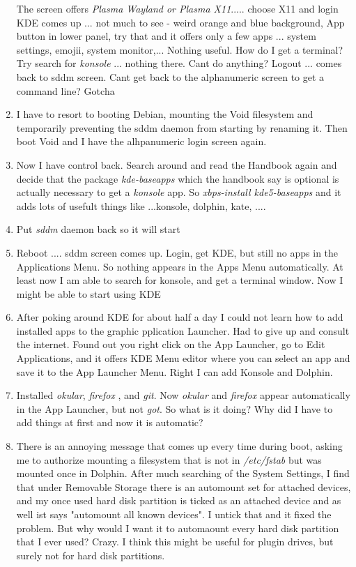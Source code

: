 \documentclass{article}  %
\begin{document}
\begin{enumerate}
The screen offers {\em Plasma Wayland or Plasma X11}..... choose X11 and login
KDE comes up ... not much to see - weird orange and blue background, App button in lower panel, try that and it offers only a few apps ... system settings, emojii, system monitor,... Nothing useful. How do I get a terminal? Try search for {\em konsole} ... nothing there. Cant do anything? Logout ... comes back to sddm screen. Cant get back to the alphanumeric screen to get a command line? Gotcha
\item I have to resort to booting Debian, mounting the Void filesystem and temporarily preventing the sddm daemon from starting by renaming it.  Then boot Void and I have the alhpanumeric login screen again.
\item Now I have control back. Search around and read the Handbook again and decide that the package {\em kde-baseapps} which the handbook say is optional is actually necessary to get a {\em konsole} app. So
{\em xbps-install kde5-baseapps}
and it adds lots of usefult things like ...konsole, dolphin, kate, ....
\item Put {\em sddm} daemon back so it will start
\item Reboot .... sddm screen comes up. Login, get KDE, but still no apps in the  Applications Menu.
So nothing appears in the Apps Menu automatically. 
At least now I am able to search for konsole, and get a terminal window.  Now I might be able to start using KDE
\item After poking around KDE for about half a day I could not learn how to add installed apps to the graphic pplication Launcher. Had to give up and consult the internet. Found out you right click on the App Launcher, go to Edit Applications, and it offers KDE Menu editor where you can select an app and save it to the App Launcher Menu. Right I can add Konsole and Dolphin.
\item Installed {\em okular}, {\em firefox} , and {\em git}. Now {\em okular} and {\em firefox} appear automatically in the App Launcher, but not {\em got}. So what is it doing? Why did I have to add things at first and now it is automatic?
\item There is an annoying message that comes up every time during boot, asking me to authorize mounting a filesystem that is not in {\em /etc/fstab} but was mounted once in Dolphin. After much searching of the System Settings, I find that under Removable Storage there is an automount set for attached devices, and my once used hard disk partition is ticked as an attached device and as well ist says "automount all known devices". I untick that and it fixed the problem. But why would I want it to automaount every hard disk partition that I ever used? Crazy. I think this might be useful for plugin drives, but surely not for hard disk partitions.
\end{enumerate}
\end{document}
